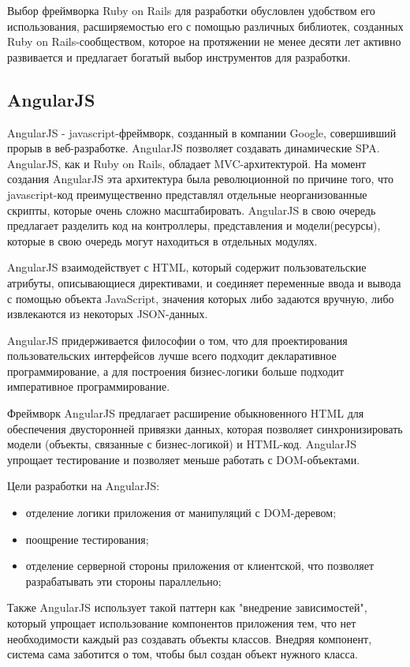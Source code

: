 Выбор фреймворка Ruby on Rails для разработки обусловлен удобством его использования, расширяемостью его с помощью различных библиотек, созданных Ruby on Rails-сообществом, которое на протяжении не менее десяти лет активно развивается и предлагает богатый выбор инструментов для разработки.

\subsection{AngularJS}
\label{sub:technologies:angular_js}
AngularJS - javascript-фреймворк, созданный в компании Google, совершивший прорыв в веб-разработке. AngularJS позволяет создавать динамические SPA. AngularJS, как и Ruby on Rails, обладает MVC-архитектурой. На момент создания AngularJS эта архитектура была революционной по причине того, что javascript-код преимущественно представлял отдельные неорганизованные скрипты, которые очень сложно масштабировать. AngularJS в свою очередь предлагает разделить код на контроллеры, представления и модели(ресурсы), которые в свою очередь могут находиться в отдельных модулях.

AngularJS взаимодействует с HTML, который содержит пользовательские атрибуты, описывающиеся директивами, и соединяет переменные ввода и вывода с помощью объекта JavaScript, значения которых либо задаются вручную, либо извлекаются из некоторых JSON-данных.

AngularJS придерживается философии о том, что для проектирования пользовательских интерфейсов лучше всего подходит декларативное программирование, а для построения бизнес-логики больше подходит императивное программирование.

Фреймворк AngularJS предлагает расширение обыкновенного HTML для обеспечения двусторонней привязки данных, которая позволяет синхронизировать модели (объекты, связанные с бизнес-логикой) и HTML-код. AngularJS упрощает тестирование и позволяет меньше работать с DOM-объектами.

Цели разработки на AngularJS:

\begin{itemize}
  \item отделение логики приложения от манипуляций с DOM-деревом;
  \item поощрение тестирования;
  \item отделение серверной стороны приложения от клиентской, что позволяет разрабатывать эти стороны параллельно;
\end{itemize}

Также AngularJS использует такой паттерн как "внедрение зависимостей", который упрощает использование компонентов приложения тем, что нет необходимости каждый раз создавать объекты классов. Внедряя компонент, система сама заботится о том, чтобы был создан объект нужного класса.

